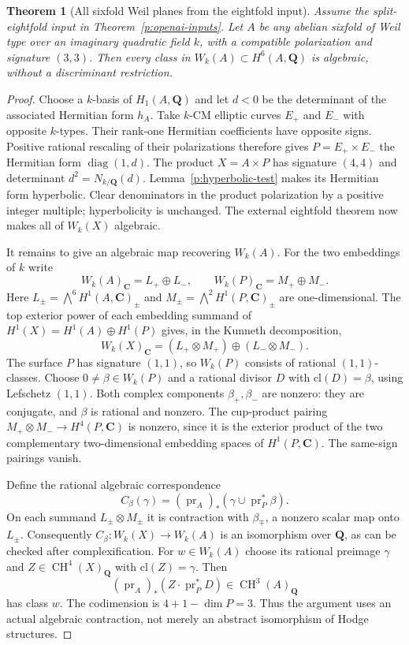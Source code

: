 \documentclass[10pt,reqno]{article}
\theoremstyle{emphasizedplain}
\theoremstyle{emphasizeddefinition}
\theoremstyle{emphasizeddefinition}
\newtheorem{pretheorem}[prelemma]{Theorem}
\DeclareMathOperator{\CH}{CH}
\newcommand{\Q}{\mathbf Q}
\newcommand{\C}{\mathbf C}
\begin{document}
\begin{pretheorem}[All sixfold Weil planes from the eightfold input]
\label{p:all-sixfold-weil}
Assume the split-eightfold input in Theorem~\ref{p:openai-inputs}.
Let $A$ be any abelian sixfold of Weil type over an imaginary quadratic
field $k$, with a compatible polarization and signature $(3,3)$.
Then every class in $W_k(A)\subset H^6(A,\Q)$ is algebraic,
without a discriminant restriction.
\end{pretheorem}
\begin{proof}
Choose a $k$-basis of $H_1(A,\Q)$ and let $d<0$ be the determinant
of the associated Hermitian form $h_A$.
Take $k$-CM elliptic curves $E_+$ and $E_-$ with opposite $k$-types.
Their rank-one Hermitian coefficients have opposite signs.
Positive rational rescaling of their polarizations therefore gives
$P=E_+\times E_-$ the Hermitian form $\operatorname{diag}(1,d)$.
The product $X=A\times P$ has signature $(4,4)$ and determinant
$d^2=N_{k/\Q}(d)$. Lemma~\ref{p:hyperbolic-test} makes its
Hermitian form hyperbolic. Clear denominators in the product
polarization by a positive integer multiple; hyperbolicity is unchanged.
The external eightfold theorem now makes all of $W_k(X)$ algebraic.

It remains to give an algebraic map recovering $W_k(A)$.
For the two embeddings of $k$ write
\[
 W_k(A)_\C=L_+\oplus L_-,\qquad
 W_k(P)_\C=M_+\oplus M_-.
\]
Here $L_\pm=\bigwedge^6 H^1(A,\C)_\pm$ and
$M_\pm=\bigwedge^2 H^1(P,\C)_\pm$ are one-dimensional.
The top exterior power of each embedding summand of
$H^1(X)=H^1(A)\oplus H^1(P)$ gives, in the Kunneth decomposition,
\[
 W_k(X)_\C=(L_+\otimes M_+)\oplus(L_-\otimes M_-).
\]
The surface $P$ has signature $(1,1)$, so $W_k(P)$ consists of
rational $(1,1)$-classes. Choose $0\ne\beta\in W_k(P)$ and a
rational divisor $D$ with $\mathrm{cl}(D)=\beta$, using Lefschetz
$(1,1)$. Both complex components $\beta_+,\beta_-$ are nonzero:
they are conjugate, and $\beta$ is rational and nonzero.
The cup-product pairing $M_+\otimes M_-\to H^4(P,\C)$ is
nonzero, since it is the exterior product of the two complementary
two-dimensional embedding spaces of $H^1(P,\C)$.
The same-sign pairings vanish.

Define the rational algebraic correspondence
\[
 C_\beta(\gamma)=(\operatorname{pr}_A)_*
       (\gamma\cup\operatorname{pr}_P^*\beta).
\]
On each summand $L_\pm\otimes M_\pm$ it is contraction with
$\beta_\mp$, a nonzero scalar map onto $L_\pm$.
Consequently $C_\beta:W_k(X)\to W_k(A)$ is an isomorphism over
$\Q$, as can be checked after complexification.
For $w\in W_k(A)$ choose its rational preimage $\gamma$ and
$Z\in\CH^4(X)_\Q$ with $\mathrm{cl}(Z)=\gamma$.
Then
\[
 (\operatorname{pr}_A)_*(Z\cdot\operatorname{pr}_P^*D)
       \in\CH^3(A)_\Q
\]
has class $w$. The codimension is $4+1-\dim P=3$.
Thus the argument uses an actual algebraic contraction, not merely
an abstract isomorphism of Hodge structures.
\end{proof}
\end{document}
